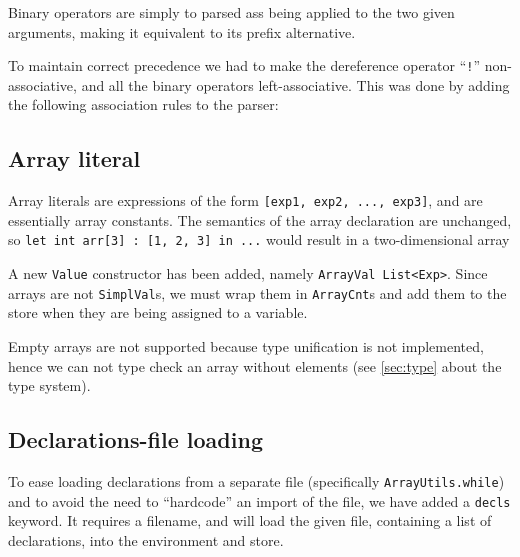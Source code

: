 \documentclass{article}
\begin{document}


Binary operators are simply to parsed ass being applied to the two
given arguments, making it equivalent to its prefix alternative.

To maintain correct precedence we had to make the dereference operator
``{\tt !}''  non-associative, and all the binary operators
left-associative. This was done by adding the following association
rules to the parser:
\begin{fs}
\end{fs}


\subsection{Array literal}
Array literals are expressions of the form {\tt [exp1, exp2, ..., exp3]}, and are essentially array constants. The semantics of the array declaration are unchanged, so {\tt let int arr[3] : [1, 2, 3] in ...} would result in a two-dimensional array

A new {\tt Value} constructor has been added, namely {\tt ArrayVal List<Exp>}. Since arrays are not {\tt SimplVal}s, we must wrap them in {\tt ArrayCnt}s and add them to the store when they are being assigned to a variable.

Empty arrays are not supported because type unification is not implemented, hence we can not type check an array without elements (see \ref{sec:type} about the type system).

\subsection{Declarations-file loading}

To ease loading declarations from a separate file (specifically {\tt ArrayUtils.while}) and to avoid the need to ``hardcode'' an import of the file, we have added a {\tt decls} keyword. It requires a filename, and will load the given file, containing a list of declarations, into the environment and store.
\end{document}
